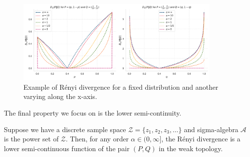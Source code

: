 \begin{example}
	\begin{figure}[h!]
		\centering
		\includegraphics[width=0.9\textwidth]{../img/renyi_divergence_comparison.pdf}
		\caption{Example of Rényi divergence for a fixed distribution and another varying along the x-axis.}
		\label{fig:renyi_divergence_example}
	\end{figure}
\end{example}

The final property we focus on is the lower semi-continuity.

\begin{thm}
	Suppose we have a discrete sample space $\mathcal{Z} = \{z_1,z_2,z_3,\dots\}$ and sigma-algebra $\mathcal{A}$ is the power set of $\mathcal{Z}$. Then, for any order $\alpha \in (0,\infty]$, the Rényi divergence is a lower semi-continuous function of the pair $(P,Q)$ in the weak topology.
	\label{semicontinuity}
\end{thm}

